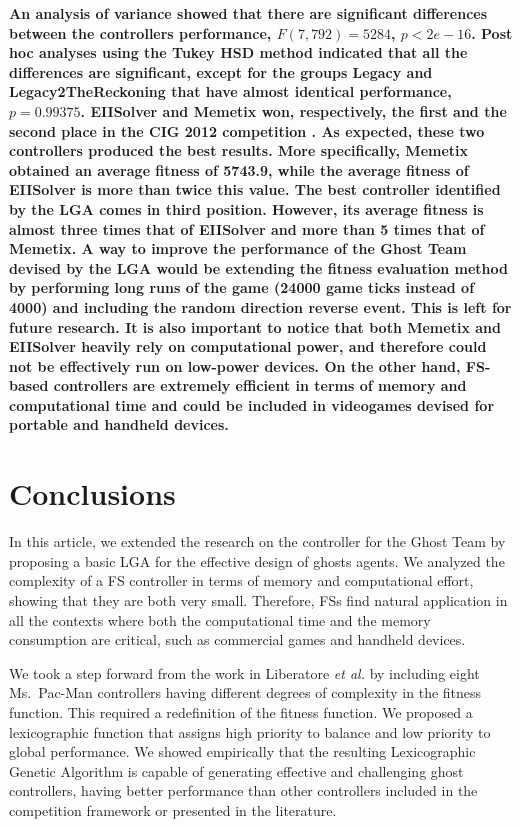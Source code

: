 \documentclass[journal]{IEEEtran}
\begin{document}
\textbf{An analysis of variance showed that there are significant differences between the controllers performance, $F(7,792) = 5284$, $p <2e-16$. Post hoc analyses using the Tukey HSD method indicated that all the differences are significant, except for the groups Legacy and Legacy2TheReckoning that have almost identical performance, $p = 0.99375$.
EIISolver and Memetix won, respectively, the first and the second place in the CIG 2012 competition \cite{CompetitionURL}. As expected, these two controllers produced the best results. More specifically, Memetix obtained an average fitness of 5743.9, while the average fitness of EIISolver is more than twice this value.
The best controller identified by the LGA comes in third position. However, its average fitness is almost three times that of EIISolver and more than 5 times that of Memetix. A way to improve the performance of the Ghost Team devised by the LGA would be extending the fitness evaluation method by performing long runs of the game (24000 game ticks instead of 4000) and including the random direction reverse event. This is left for future research. It is also important to notice that both Memetix and EIISolver heavily rely on computational power, and therefore could not be effectively run on low-power devices. On the other hand, FS-based controllers are extremely efficient in terms of memory and computational time and could be included in videogames devised for portable and handheld devices.}

\section{Conclusions}
\label{sec:Conclusions}
In this article, we extended the research on the controller for the Ghost Team by proposing a basic LGA for the effective design of ghosts agents. We analyzed the complexity of a FS controller in terms of memory and computational effort, showing that they are both very small. Therefore, FSs find natural application in all the contexts where both the computational time and the memory consumption are critical, such as commercial games and handheld devices.

We took a step forward from the work in Liberatore \emph{et al.} \cite{Liberatore2014} by including eight Ms.\  Pac-Man controllers having different degrees of complexity in the fitness function. This required a redefinition of the fitness function. We proposed a lexicographic function that assigns high priority to balance and low priority to global performance. We showed empirically that the resulting Lexicographic Genetic Algorithm is capable of generating effective and challenging ghost controllers, having better performance than other controllers included in the competition framework or presented in the literature.
\end{document}
